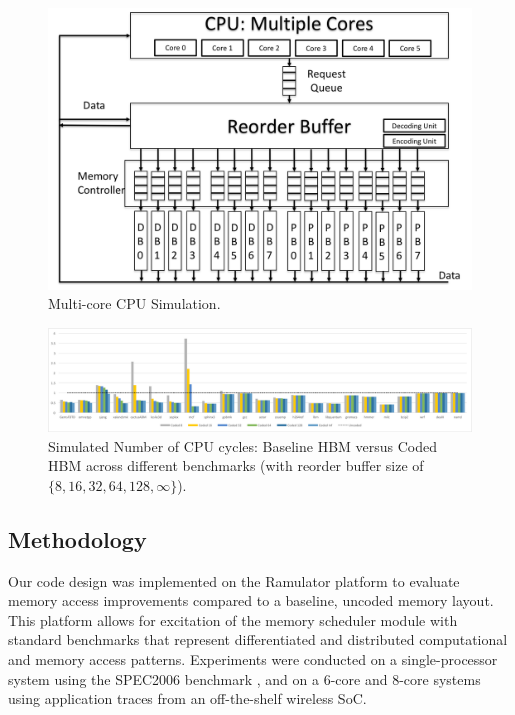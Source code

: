 \begin{figure}[h!] \centering
\includegraphics[width=0.9\linewidth]{figures/multi-core-cpu.png} 
\caption{Multi-core CPU Simulation.}
\label{fig:multi-core-cpu}
\end{figure}


\begin{figure}[t!] \centering
\includegraphics[width=1\linewidth]{figures/spec-cycles-all.pdf} 
\caption{Simulated Number of CPU cycles: Baseline HBM versus Coded HBM across different benchmarks (with reorder buffer size of $\{8,16,32,64,128,\infty\}$). }
\label{fig:spec-cycles}
\end{figure}


\subsection{Methodology}
Our code design was implemented on the Ramulator platform \cite{Ramulator} to evaluate memory access improvements compared to a baseline, uncoded memory layout. This platform allows for excitation of the memory scheduler module with standard benchmarks that represent differentiated and distributed computational and memory access patterns. Experiments were conducted on a single-processor system using the SPEC2006 benchmark \cite{SPEC2006}, and on a $6$-core and $8$-core systems using application traces from an off-the-shelf wireless SoC. 

